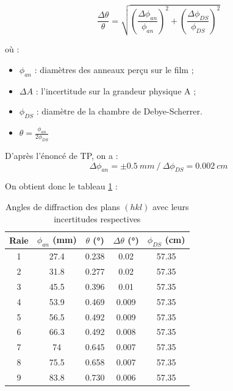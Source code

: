 \begin{equation}\label{eq:TypeB}
	\frac{\Delta \theta}{\theta} = \sqrt{\left ( \frac{\Delta \phi_{an}}{\phi_{an}} \right )^2 + \left ( \frac{\Delta \phi_{DS}}{\phi_{DS}} \right )^2 }
\end{equation}

où :

\begin{itemize}
	\item $\phi_{an}$ : diamètres des anneaux perçu sur le film ;
	
	\item $\Delta A$ : l'incertitude sur la grandeur physique A ;
	

	
	\item $\phi_{DS}$ : diamètre de la chambre de Debye-Scherrer.
	
	\item $\theta = \frac{\phi_{an}}{2\phi_{DS}}$
\end{itemize}

D'après l'énoncé de TP, on a :
\begin{equation}
	\Delta \phi_{an} = \pm 0.5 \ mm  \ / \ \Delta \phi_{DS} = 0.002 \ cm
\end{equation}

On obtient donc le tableau \ref{tab:Tableau des angles correspondant aux diffrentes raies en fonction de phi DS} : 










\begin{table}[h!]
	\centering
	\begin{tabular}{|c|c|c|c|c|}
		
		\hline
Raie	&	$\phi_{an}$ (mm) & $\theta $ (°)	 & $\Delta \theta$ (°) & $\phi_{DS}$ (cm) \\ \hline
1 &	27.4	&           0.238          &    0.02    & 57.35\\ \hline
2 &	31.8	&        0.277              &   0.02     & 57.35\\ \hline
3 &	45.5	&          0.396           &    0.01   & 57.35 \\ \hline
4 &	53.9	&          0.469            &  0.009      & 57.35\\ \hline
 5 &	56.5	&      0.492                 &   0.009   &57.35  \\ \hline
6&	66.3	&            0.492          &     0.008	  & 57.35\\ \hline
7&	74	&               0.645        &     0.007   & 57.35\\ \hline
8&	75.5	&           0.658           &   0.007    & 57.35 \\ \hline
9&	83.8	&            0.730          &   0.006    & 57.35 \\ \hline
	\end{tabular}
	\caption{Angles de diffraction des plans $(h k l)$ avec leurs incertitudes respectives
	 }
	\label{tab:Tableau des angles correspondant aux diffrentes raies en fonction de phi DS}
\end{table}


